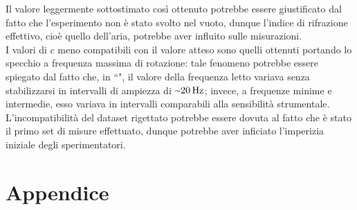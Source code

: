\documentclass[]{article}
\let\oldsection\section%
\renewcommand{\section}{%
	\renewcommand{\theequation}{\thesection.\arabic{equation}}%
	\oldsection}%
\newcommand{\virgolette}[1]{``\text{#1}"}
\newcommand{\tildetext}{\raise.17ex\hbox{$\scriptstyle\mathtt{\sim}$}}
\begin{document}
    Il valore leggermente sottostimato così ottenuto potrebbe essere giustificato dal fatto che l'esperimento non è stato svolto nel vuoto, dunque l'indice di rifrazione effettivo, cioè quello dell'aria, potrebbe aver influito sulle misurazioni. \\
    I valori di $c$ meno compatibili con il valore atteso sono quelli ottenuti portando lo specchio a frequenza massima di rotazione: tale fenomeno potrebbe essere spiegato dal fatto che, in \virgolette{modalità turbo}, il valore della frequenza letto variava senza stabilizzarsi in intervalli di ampiezza di $\tildetext 20\,\text{Hz}$; invece, a frequenze minime e intermedie, esso variava in intervalli comparabili alla sensibilità strumentale. \\ 
    L'incompatibilità del dataset rigettato potrebbe essere dovuta al fatto che è stato il primo set di misure effettuato, dunque potrebbe aver inficiato l'imperizia iniziale degli sperimentatori.

    \newpage
    \section*{Appendice}
\end{document}

